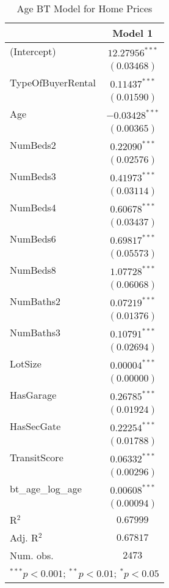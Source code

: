 
\begin{table}
\begin{center}
\begin{tabular}{l c}
\hline
 & Model 1 \\
\hline
(Intercept)       & $12.27956^{***}$ \\
                  & $(0.03468)$      \\
TypeOfBuyerRental & $0.11437^{***}$  \\
                  & $(0.01590)$      \\
Age               & $-0.03428^{***}$ \\
                  & $(0.00365)$      \\
NumBeds2          & $0.22090^{***}$  \\
                  & $(0.02576)$      \\
NumBeds3          & $0.41973^{***}$  \\
                  & $(0.03114)$      \\
NumBeds4          & $0.60678^{***}$  \\
                  & $(0.03437)$      \\
NumBeds6          & $0.69817^{***}$  \\
                  & $(0.05573)$      \\
NumBeds8          & $1.07728^{***}$  \\
                  & $(0.06068)$      \\
NumBaths2         & $0.07219^{***}$  \\
                  & $(0.01376)$      \\
NumBaths3         & $0.10791^{***}$  \\
                  & $(0.02694)$      \\
LotSize           & $0.00004^{***}$  \\
                  & $(0.00000)$      \\
HasGarage         & $0.26785^{***}$  \\
                  & $(0.01924)$      \\
HasSecGate        & $0.22254^{***}$  \\
                  & $(0.01788)$      \\
TransitScore      & $0.06332^{***}$  \\
                  & $(0.00296)$      \\
bt\_age\_log\_age & $0.00608^{***}$  \\
                  & $(0.00094)$      \\
\hline
R$^2$             & $0.67999$        \\
Adj. R$^2$        & $0.67817$        \\
Num. obs.         & $2473$           \\
\hline
\multicolumn{2}{l}{\scriptsize{$^{***}p<0.001$; $^{**}p<0.01$; $^{*}p<0.05$}}
\end{tabular}
\caption{Age BT Model for Home Prices}
\label{tab:reg_bt_age}
\end{center}
\end{table}
